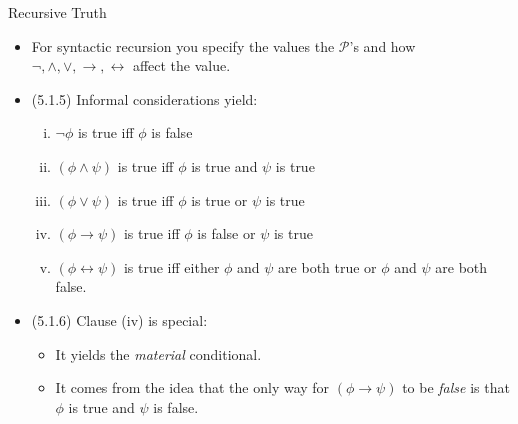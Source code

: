 \begin{frame}{Recursive Truth}

	\begin{itemize}
	
			\item \alert{For syntactic recursion you specify the values the $\mathcal{P}$'s and how $\neg,\land,\lor,\to,\leftrightarrow$ affect the value.}
	
	
			\item (5.1.5) Informal considerations yield:
			
			\begin{enumerate}[(i)]
						
				\item $\neg\phi$ is true iff $\phi$ is false
					
				\item $(\phi\land\psi)$ is true iff $\phi$ is true and $\psi$ is true					
						
				\item $(\phi\lor\psi)$ is true iff $\phi$ is true or $\psi$ is true						
				
				\item  $(\phi\to\psi)$ is true iff $\phi$ is false or $\psi$ is true							
				
				\item $(\phi\leftrightarrow\psi)$ is true iff either $\phi$ and $\psi$ are both true or $\phi$ and $\psi$ are both false.			
					
				\end{enumerate}
				
			\item (5.1.6) Clause (iv) is special:
			
				\begin{itemize}
				
					\item It yields the \emph{material} conditional.
					
					\item It comes from the idea that the only way for $(\phi\to\psi)$ to be \emph{false} is that $\phi$ is true and $\psi$ is false.
			
				\end{itemize}
	
	\end{itemize}

\end{frame}

